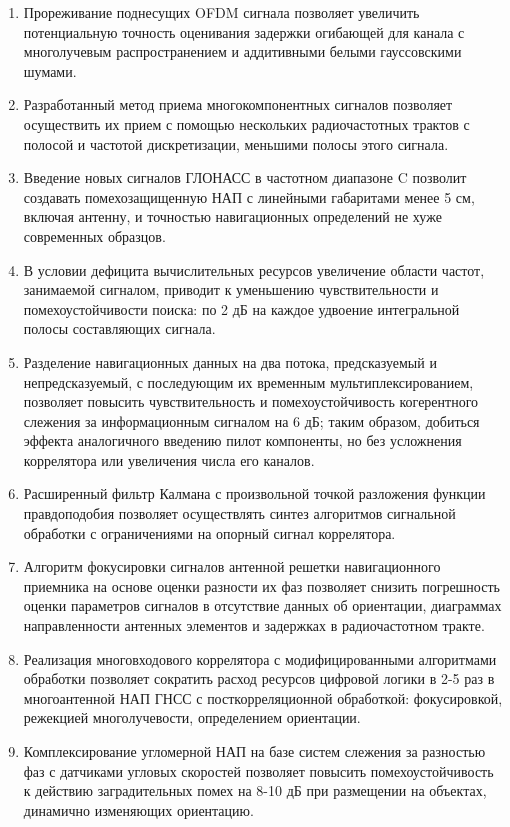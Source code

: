 \begin{enumerate}%
\item Прореживание поднесущих OFDM сигнала позволяет увеличить потенциальную точность оценивания задержки огибающей для канала с многолучевым распространением и аддитивными белыми гауссовскими шумами.
\item Разработанный метод приема многокомпонентных сигналов позволяет осуществить их прием с помощью нескольких радиочастотных трактов с полосой и частотой дискретизации, меньшими полосы этого сигнала.
\item Введение новых сигналов ГЛОНАСС в частотном диапазоне C позволит создавать помехозащищенную НАП с линейными габаритами менее 5 см, включая антенну, и точностью навигационных определений не хуже современных образцов.
\item В условии дефицита вычислительных ресурсов увеличение области частот, занимаемой сигналом, приводит к уменьшению чувствительности и помехоустойчивости поиска: по 2 дБ на каждое удвоение интегральной полосы составляющих сигнала.
\item Разделение навигационных данных на два потока, предсказуемый и непредсказуемый, с последующим их временным мультиплексированием, позволяет повысить чувствительность и помехоустойчивость когерентного слежения за информационным сигналом на 6 дБ; таким образом, добиться эффекта аналогичного введению пилот компоненты, но без усложнения коррелятора или увеличения числа его каналов.
\item Расширенный фильтр Калмана с произвольной точкой разложения функции правдоподобия позволяет осуществлять синтез алгоритмов сигнальной обработки с ограничениями на опорный сигнал коррелятора.
\item Алгоритм фокусировки сигналов антенной решетки навигационного приемника на основе оценки разности их фаз позволяет снизить погрешность оценки параметров сигналов в отсутствие данных об ориентации, диаграммах направленности антенных элементов и задержках в радиочастотном тракте.
\item Реализация многовходового коррелятора с модифицированными алгоритмами обработки позволяет сократить расход ресурсов цифровой логики в 2-5 раз в многоантенной НАП ГНСС с посткорреляционной обработкой: фокусировкой, режекцией многолучевости, определением ориентации.
\item Комплексирование угломерной НАП на базе систем слежения за разностью фаз с датчиками угловых скоростей позволяет повысить помехоустойчивость к действию заградительных помех на 8-10 дБ при размещении на объектах, динамично изменяющих ориентацию.
\end{enumerate}

